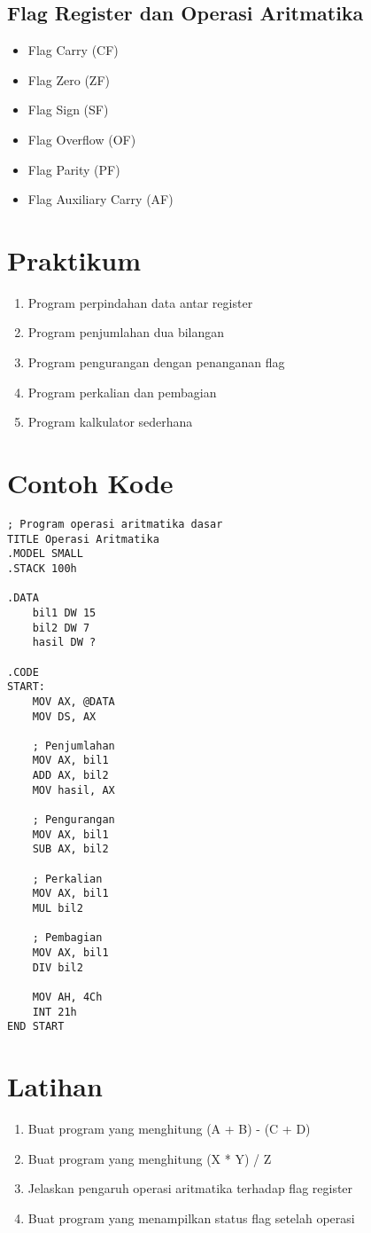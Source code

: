 \subsection{Flag Register dan Operasi Aritmatika}
\begin{itemize}
\item Flag Carry (CF)
\item Flag Zero (ZF)
\item Flag Sign (SF)
\item Flag Overflow (OF)
\item Flag Parity (PF)
\item Flag Auxiliary Carry (AF)
\end{itemize}

\section{Praktikum}
\begin{enumerate}
\item Program perpindahan data antar register
\item Program penjumlahan dua bilangan
\item Program pengurangan dengan penanganan flag
\item Program perkalian dan pembagian
\item Program kalkulator sederhana
\end{enumerate}

\section{Contoh Kode}
\begin{verbatim}
; Program operasi aritmatika dasar
TITLE Operasi Aritmatika
.MODEL SMALL
.STACK 100h

.DATA
    bil1 DW 15
    bil2 DW 7
    hasil DW ?

.CODE
START:
    MOV AX, @DATA
    MOV DS, AX
    
    ; Penjumlahan
    MOV AX, bil1
    ADD AX, bil2
    MOV hasil, AX
    
    ; Pengurangan
    MOV AX, bil1
    SUB AX, bil2
    
    ; Perkalian
    MOV AX, bil1
    MUL bil2
    
    ; Pembagian
    MOV AX, bil1
    DIV bil2
    
    MOV AH, 4Ch
    INT 21h
END START
\end{verbatim}

\section{Latihan}
\begin{enumerate}
\item Buat program yang menghitung (A + B) - (C + D)
\item Buat program yang menghitung (X * Y) / Z
\item Jelaskan pengaruh operasi aritmatika terhadap flag register
\item Buat program yang menampilkan status flag setelah operasi
\end{enumerate}


